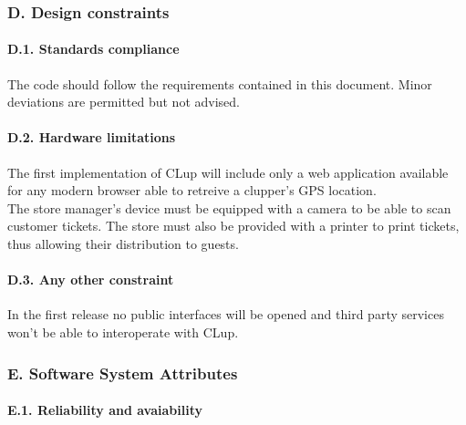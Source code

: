 \hypertarget{d.-design-constraints}{%
\subsubsection{D. Design constraints}\label{d.-design-constraints}}

\hypertarget{d.1.-standards-compliance}{%
\paragraph{D.1. Standards compliance}\label{d.1.-standards-compliance}}

The code should follow the requirements contained in this document.
Minor deviations are permitted but not advised.

\hypertarget{d.2.-hardware-limitations}{%
\paragraph{D.2. Hardware limitations}\label{d.2.-hardware-limitations}}

The first implementation of CLup will include only a web application
available for any modern browser able to retreive a clupper's GPS
location.\\
The store manager's device must be equipped with a camera to be able to
scan customer tickets. The store must also be provided with a printer to
print tickets, thus allowing their distribution to guests.

\hypertarget{d.3.-any-other-constraint}{%
\paragraph{D.3. Any other constraint}\label{d.3.-any-other-constraint}}

In the first release no public interfaces will be opened and third party
services won't be able to interoperate with CLup.

\hypertarget{e.-software-system-attributes}{%
\subsubsection{E. Software System
Attributes}\label{e.-software-system-attributes}}

\hypertarget{e.1.-reliability-and-avaiability}{%
\paragraph{E.1. Reliability and
avaiability}\label{e.1.-reliability-and-avaiability}}

